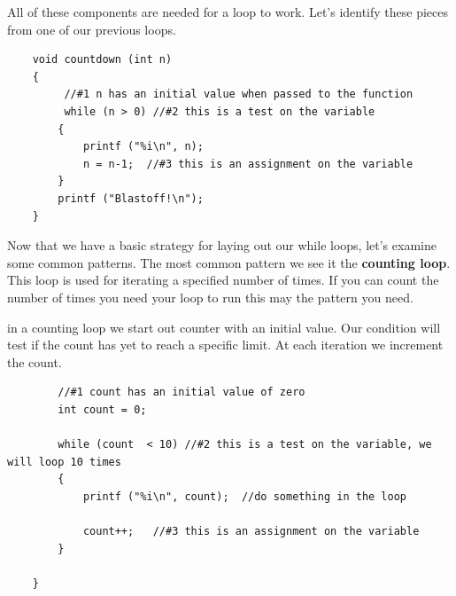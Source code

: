 All of these components are needed for a loop to work. Let's identify these pieces from one of our previous loops. 

\begin{verbatim}
	void countdown (int n) 
	{
		 //#1 n has an initial value when passed to the function
		 while (n > 0) //#2 this is a test on the variable
	 	{
		 	printf ("%i\n", n);
		 	n = n-1;  //#3 this is an assignment on the variable
	 	}
	 	printf ("Blastoff!\n");
	}
\end{verbatim}
%
Now that we have a basic strategy for laying out our while loops, let's examine some common patterns. The most common pattern we see it the {\bf counting loop}. This loop is used for iterating a specified number of times. If you can count the number of times you need your loop to run this may the pattern you need.

in a counting loop we start out counter with an initial value. Our condition will test if the count has yet to reach a specific limit. At each iteration we increment the count. 
\begin{verbatim}
		//#1 count has an initial value of zero
		int count = 0;
		
		while (count  < 10) //#2 this is a test on the variable, we will loop 10 times
		{
			printf ("%i\n", count);  //do something in the loop
			
			count++;   //#3 this is an assignment on the variable
		}
	
	}
\end{verbatim}
%

